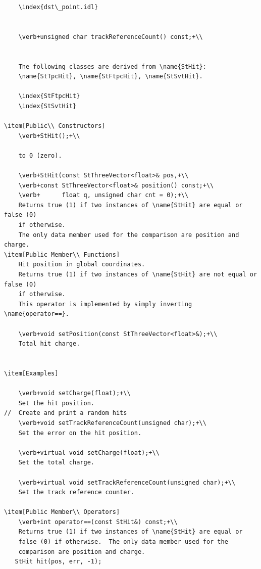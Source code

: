 \begin{enumerate}
\begin{Entry}
{\begin{verbatim}
    \index{dst\_point.idl}

    
    \verb+unsigned char trackReferenceCount() const;+\\    

    
    The following classes are derived from \name{StHit}:
    \name{StTpcHit}, \name{StFtpcHit}, \name{StSvtHit}.
    
    \index{StFtpcHit}
    \index{StSvtHit}
    
\item[Public\\ Constructors]
    \verb+StHit();+\\
    
    to 0 (zero).

    \verb+StHit(const StThreeVector<float>& pos,+\\
    \verb+const StThreeVector<float>& position() const;+\\
    \verb+      float q, unsigned char cnt = 0);+\\
    Returns true (1) if two instances of \name{StHit} are equal or false (0)
    if otherwise.
    The only data member used for the comparison are position and charge.
\item[Public Member\\ Functions]
    Hit position in global coordinates.
    Returns true (1) if two instances of \name{StHit} are not equal or false (0)
    if otherwise. 
    This operator is implemented by simply inverting \name{operator==}.
        
    \verb+void setPosition(const StThreeVector<float>&);+\\
    Total hit charge.

    
\item[Examples] 

    \verb+void setCharge(float);+\\
    Set the hit position.
//  Create and print a random hits 
    \verb+void setTrackReferenceCount(unsigned char);+\\
    Set the error on the hit position.

    \verb+virtual void setCharge(float);+\\
    Set the total charge.

    \verb+virtual void setTrackReferenceCount(unsigned char);+\\
    Set the track reference counter.
    
\item[Public Member\\ Operators]
    \verb+int operator==(const StHit&) const;+\\
    Returns true (1) if two instances of \name{StHit} are equal or
    false (0) if otherwise.  The only data member used for the
    comparison are position and charge.
   StHit hit(pos, err, -1); 


\end{verbatim}}
\end{Entry}
\end{enumerate}
